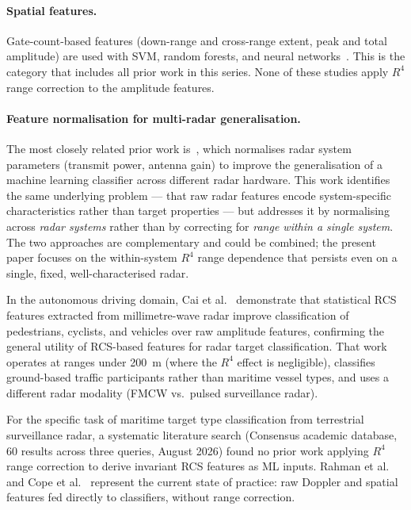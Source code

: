 \documentclass[journal]{IEEEtran}
\begin{document}
\paragraph{Spatial features.} Gate-count-based features (down-range and
cross-range extent, peak and total amplitude) are used with SVM, random
forests, and neural networks~\cite{shepherd2022vessel,haykin1991clutter}. This is the
category that includes all prior work in this series. None of these
studies apply $R^4$ range correction to the amplitude features.

\paragraph{Feature normalisation for multi-radar generalisation.}
The most closely related prior work is~\cite{zhao2025norm}, which
normalises radar system parameters (transmit power, antenna gain) to
improve the generalisation of a machine learning classifier across
different radar hardware. This work identifies the same underlying
problem — that raw radar features encode system-specific characteristics
rather than target properties — but addresses it by normalising across
\emph{radar systems} rather than by correcting for \emph{range within
a single system}. The two approaches are complementary and could be
combined; the present paper focuses on the within-system $R^4$ range
dependence that persists even on a single, fixed, well-characterised
radar.

In the autonomous driving domain, Cai et al.~\cite{cai2021mmwave}
demonstrate that statistical RCS features extracted from millimetre-wave
radar improve classification of pedestrians, cyclists, and vehicles over
raw amplitude features, confirming the general utility of RCS-based
features for radar target classification. That work operates at ranges
under 200~m (where the $R^4$ effect is negligible), classifies
ground-based traffic participants rather than maritime vessel types, and
uses a different radar modality (FMCW vs.\ pulsed surveillance radar).

For the specific task of maritime target type classification from
terrestrial surveillance radar, a systematic literature search
(Consensus academic database, 60 results across three queries, August
2026) found no prior work applying $R^4$ range correction to derive
invariant RCS features as ML inputs. Rahman et al.~\cite{rahman2023mmwave}
and Cope et al.~\cite{cope2021tracking} represent the current state of
practice: raw Doppler and spatial features fed directly to classifiers,
without range correction.
\end{document}
